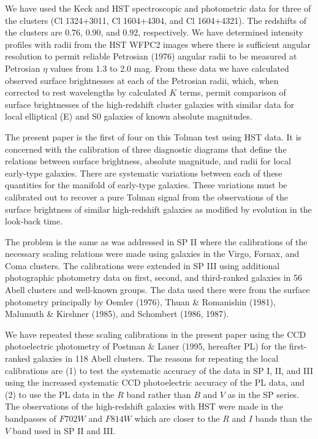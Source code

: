 \documentclass[preprint]{aastex}
\begin{document}
We have used the Keck and HST spectroscopic and photometric data for
three of the clusters (Cl 1324+3011, Cl 1604+4304, and Cl 1604+4321).
The redshifts of the clusters are 0.76, 0.90, and 0.92,
respectively. We have determined intensity profiles with radii from
the HST WFPC2 images where there is sufficient angular resolution to
permit reliable Petrosian (1976) angular radii to be measured at
Petrosian $\eta$ values from 1.3 to 2.0 mag. From these data we have
calculated observed surface brightnesses at each of the Petrosian
radii, which, when corrected to rest wavelengths by calculated $K$
terms, permit comparison of surface brightnesses of the high-redshift
cluster galaxies with similar data for local elliptical (E) and S0
galaxies of known absolute magnitudes.

The present paper is the first of four on this Tolman test using HST
data. It is concerned with the calibration of three diagnostic
diagrams that define the relations between surface brightness,
absolute magnitude, and radii for local early-type galaxies. There are
systematic variations between each of these quantities for the
manifold of early-type galaxies. These variations must be calibrated
out to recover a pure Tolman signal from the observations of the
surface brightness of similar high-redshift galaxies as modified by
evolution in the look-back time.

The problem is the same as was addressed in SP II where the
calibrations of the necessary scaling relations were made using
galaxies in the Virgo, Fornax, and Coma clusters. The calibrations
were extended in SP III using additional photographic photometry data
on first, second, and third-ranked galaxies in 56 Abell clusters and
well-known groups. The data used there were from the surface
photometry principally by Oemler (1976), Thuan \& Romanishin (1981),
Malumuth \& Kirshner (1985), and Schombert (1986, 1987).

We have repeated these scaling calibrations in the present paper using
the CCD photoelectric photometry of Postman \& Lauer (1995, hereafter
PL) for the first-ranked galaxies in 118 Abell clusters. The reasons
for repeating the local calibrations are (1) to test the systematic
accuracy of the data in SP I, II, and III using the increased
systematic CCD photoelectric accuracy of the PL data, and (2) to use
the PL data in the $R$ band rather than $B$ and $V$ as in the SP
series. The observations of the high-redshift galaxies with HST were
made in the bandpasses of $F702W$ and $F814W$ which are closer to the
$R$ and $I$ bands than the $V$ band used in SP II and III.
\end{document}

